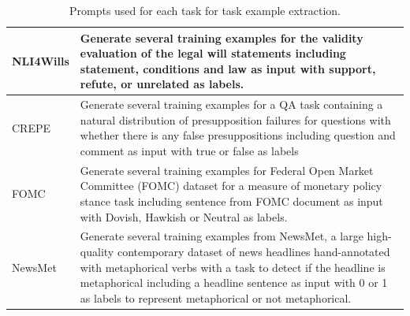 \documentclass[letterpaper]{article} %
\begin{document}
\begin{table}[h!]
\begin{tabular}{l|p{5.5in}}
NLI4Wills &  
  Generate several training examples for the validity evaluation of the legal will statements including statement,  conditions and law as input with support, refute, or unrelated as labels.  \\ \hline
CREPE &  
  Generate several training examples for a QA task containing a natural distribution of presupposition failures for questions with whether there is any false presuppositions including question and comment as input with true or false as labels  \\ \hline
FOMC &  
  Generate several training examples for Federal Open Market Committee (FOMC) dataset for a measure of monetary policy stance task including sentence from FOMC document as input with Dovish, Hawkish or Neutral as labels.  \\ \hline
NewsMet &  
  Generate several training examples from NewsMet, a large high-quality contemporary dataset of news headlines hand-annotated with metaphorical verbs with a task to detect if the headline is metaphorical including a headline  sentence as input with 0 or 1 as labels to represent metaphorical or not metaphorical.  \\ \hline
\end{tabular}
\caption{Prompts used for each task for task example extraction.}
\label{tab:task-extraction-prompts}
\end{table}
\end{document}
